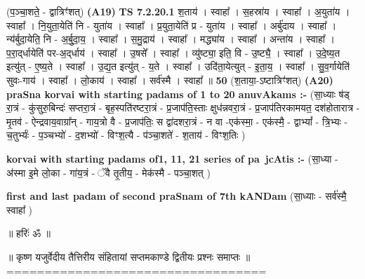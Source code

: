 \documentclass[17pt]{extarticle}
\begin{document}
                  \newline
                      (प॒ञ्चा॒शते॒ - द्वात्रिꣳ॑शत्)  \textbf{(A19)} \newline \newline
                                \textbf{ TS 7.2.20.1} \newline
                  श॒ताय॑ । स्वाहा᳚ । स॒हस्रा॑य । स्वाहा᳚ । अ॒युता॑य । स्वाहा᳚ । नि॒युता॒येति॑ नि - युता॑य । स्वाहा᳚ । प्र॒युता॒येति॑ प्र - युता॑य । स्वाहा᳚ । अर्बु॑दाय । स्वाहा᳚ । न्य॑र्बुदा॒येति॒ नि - अ॒र्बु॒दा॒य॒ । स्वाहा᳚ । स॒मु॒द्राय॑ । स्वाहा᳚ । मद्ध्या॑य । स्वाहा᳚ । अन्ता॑य । स्वाहा᳚ । प॒रा॒द्‌र्धायेति॑ पर-अ॒द्‌र्धाय॑ । स्वाहा᳚ । उ॒षसे᳚ । स्वाहा᳚ । व्यु॑ष्ट्या॒ इति॒ वि - उ॒ष्ट्यै॒ । स्वाहा᳚ । उ॒दे॒ष्य॒त इत्यु॑त् - ए॒ष्य॒ते । स्वाहा᳚ । उ॒द्य॒त इत्यु॑त् - य॒ते । स्वाहा᳚ । उदि॑ता॒येत्युत् - इ॒ता॒य॒ । स्वाहा᳚ । सु॒व॒र्गायेति॑ सुवः-गाय॑ । स्वाहा᳚ । लो॒काय॑ । स्वाहा᳚ । सर्व॑स्मै । स्वाहा᳚ ॥ \textbf{  50 } \newline
                  \newline
                      (श॒ताया॒-ऽष्टात्रिꣳ॑शत्)  \textbf{(A20)} \newline \newline
\textbf{praSna korvai with starting padams of 1 to 20 anuvAkams :-} \newline
(सा॒ध्याः ष॑ड् रा॒त्रं - कु॑सुरु॒बिन्दः॑ सप्तरा॒त्रं - बृह॒स्पति॑रष्टरा॒त्रं - प्र॒जाप॑ति॒स्ताः क्षुध॑न्नवरा॒त्रं - प्र॒जाप॑तिरकामयत॒ दश॑होतारात्र - मृ॒तव॑ - ऐन्द्रवाय॒वाग्रा᳚न् - गाय॒त्रो वै - प्र॒जाप॑तिः॒ स द्वा॑दशरा॒त्रं - न वा -एक॑स्मा॒ - एक॑स्मै॒ - द्वाभ्यां᳚ - त्रि॒भ्यः - च॒तुर्भ्यः॑ - प॒ञ्चभ्यो॑ - द॒शभ्यो॑ - विꣳश॒त्यै - प॑ञ्चा॒शते॑ - श॒ताय॑ - विꣳश॒तिः ) \newline

\textbf{korvai with starting padams of1, 11, 21 series of pa~jcAtis :-} \newline
(सा॒ध्या - अ॑स्मा इ॒मे लो॒का - गा॑य॒त्रं - ॅवै तृ॒तीय॒ - मेक॑स्मै - पञ्चा॒शत् ) \newline

\textbf{first and last padam of second praSnam of 7th kANDam} \newline
(सा॒ध्याः - सर्व॑स्मै॒ स्वाहा᳚ ) \newline 


॥ हरिः॑ ॐ ॥

॥ कृष्ण यजुर्वेदीय तैत्तिरीय संहितायां सप्तमकाण्डे द्वितीयः प्रश्नः समाप्तः ॥
================================== \newline
\pagebreak
\pagebreak
        
\end{document}
